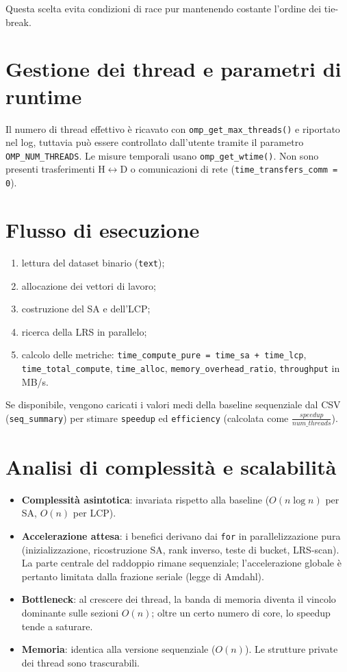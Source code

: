 		Questa scelta evita condizioni di race pur mantenendo costante l’ordine dei tie-break.
	
	\section{Gestione dei thread e parametri di runtime}
		Il numero di thread effettivo è ricavato con \texttt{omp\_get\_max\_threads()} e riportato nel log, tuttavia può essere controllato dall'utente tramite il parametro \texttt{OMP\_NUM\_THREADS}.
		Le misure temporali usano \texttt{omp\_get\_wtime()}.
		Non sono presenti trasferimenti H$\leftrightarrow$D o comunicazioni di rete (\texttt{time\_transfers\_comm = 0}).
	
	\section{Flusso di esecuzione}
		\begin{enumerate}
			\item lettura del dataset binario (\texttt{text});
			\item allocazione dei vettori di lavoro;
			\item costruzione del SA e dell'LCP;
			\item ricerca della LRS in parallelo;
			\item calcolo delle metriche: \texttt{time\_compute\_pure = time\_sa + time\_lcp}, \texttt{time\_total\_compute}, \texttt{time\_alloc}, \texttt{memory\_overhead\_ratio}, \texttt{throughput} in MB/s.
		\end{enumerate}
		
		Se disponibile, vengono caricati i valori medi della baseline sequenziale dal CSV (\texttt{seq\_summary}) per stimare \texttt{speedup} ed \texttt{efficiency} (calcolata come \texttt{$\frac{speedup}{num\_threads}$}).
	
	\section{Analisi di complessità e scalabilità}
		\begin{itemize}
			\item \textbf{Complessità asintotica}: invariata rispetto alla baseline ($O(n \log n)$ per SA, $O(n)$ per LCP).
			\item \textbf{Accelerazione attesa}: i benefici derivano dai \texttt{for} in parallelizzazione pura (inizializzazione, ricostruzione SA, rank inverso, teste di bucket, LRS-scan).
			La parte centrale del raddoppio rimane sequenziale; l'accelerazione globale è pertanto limitata dalla frazione seriale (legge di Amdahl).
			\item \textbf{Bottleneck}: al crescere dei thread, la banda di memoria diventa il vincolo dominante sulle sezioni $O(n)$; oltre un certo numero di core, lo speedup tende a saturare.
			\item \textbf{Memoria}: identica alla versione sequenziale ($O(n)$). Le strutture private dei thread sono trascurabili.
		\end{itemize}
	

